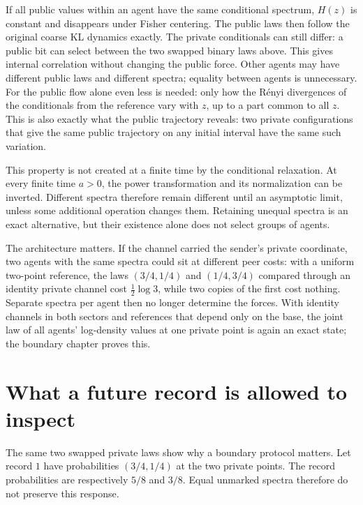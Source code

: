 If all public values within an agent have the same conditional spectrum, $H(z)$ is constant and disappears under Fisher centering. The public laws then follow the original coarse KL dynamics exactly. The private conditionals can still differ: a public bit can select between the two swapped binary laws above. This gives internal correlation without changing the public force. Other agents may have different public laws and different spectra; equality between agents is unnecessary. For the public flow alone even less is needed: only how the R\'enyi divergences of the conditionals from the reference vary with $z$, up to a part common to all $z$. This is also exactly what the public trajectory reveals: two private configurations that give the same public trajectory on any initial interval have the same such variation.

This property is not created at a finite time by the conditional relaxation. At every finite time $a>0$, the power transformation and its normalization can be inverted. Different spectra therefore remain different until an asymptotic limit, unless some additional operation changes them. Retaining unequal spectra is an exact alternative, but their existence alone does not select groups of agents.

The architecture matters. If the channel carried the sender's private coordinate, two agents with the same spectra could sit at different peer costs: with a uniform two-point reference, the laws $(3/4,1/4)$ and $(1/4,3/4)$ compared through an identity private channel cost $\tfrac12\log3$, while two copies of the first cost nothing. Separate spectra per agent then no longer determine the forces. With identity channels in both sectors and references that depend only on the base, the joint law of all agents' log-density values at one private point is again an exact state; the boundary chapter proves this.

\section{What a future record is allowed to inspect}

The same two swapped private laws show why a boundary protocol matters. Let record $1$ have probabilities $(3/4,1/4)$ at the two private points. The record probabilities are respectively $5/8$ and $3/8$. Equal unmarked spectra therefore do not preserve this response.

